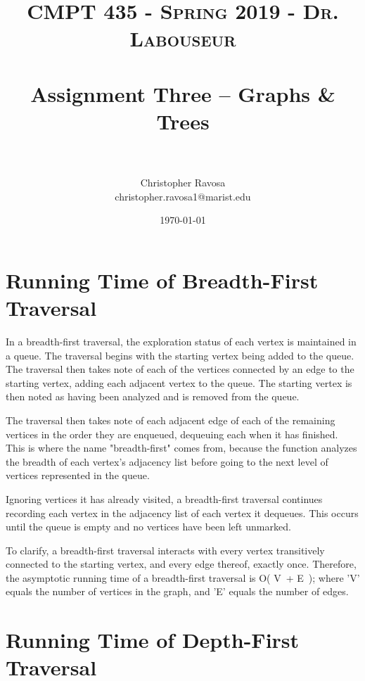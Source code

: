 \documentclass[letterpaper, 10pt]{article}
\title{	
   \normalfont \normalsize 
   \textsc{CMPT 435 - Spring 2019 - Dr. Labouseur} \\[10pt] %
   \horrule{0.5pt} \\[0.25cm] 	%
   \huge Assignment Three -- Graphs \& Trees \\   %
   \horrule{0.5pt} \\[0.25cm] 	%
}
\author{Christopher Ravosa \\ \normalsize christopher.ravosa1@marist.edu}
\date{\normalsize\today} %
\begin{document}
\maketitle %

\section{Running Time of Breadth-First Traversal}\par

In a breadth-first traversal, the exploration status of each  vertex is maintained in a queue. The traversal begins with the starting vertex being added to the queue. The traversal then takes note of each of the vertices connected by an edge to the starting vertex, adding each adjacent vertex to the queue. The starting vertex is then noted as having been analyzed and is removed from the queue.\par
The traversal then takes note of each adjacent edge of each of the remaining vertices in the order they are enqueued, dequeuing each when it has finished. This is where the name "breadth-first" comes from, because the function analyzes the breadth of each vertex's adjacency list before going to the next level of vertices represented in the queue.\par
Ignoring vertices it has already visited, a breadth-first traversal continues recording each vertex in the adjacency list of each vertex it dequeues. This occurs until the queue is empty and no vertices have been left unmarked.\par
To clarify, a breadth-first traversal interacts with every vertex transitively connected to the starting vertex, and every edge thereof, exactly once. Therefore, the asymptotic running time of a breadth-first traversal is O( \textbar V\textbar \ + \textbar E\textbar \ ); where 'V' equals the number of vertices in the graph, and 'E' equals the number of edges.\par


\section{Running Time of Depth-First Traversal}\par
\end{document}
